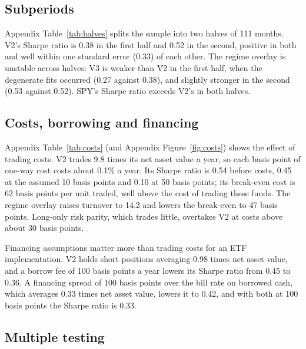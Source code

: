 \documentclass[11pt,a4paper]{article}
\begin{document}
\subsection{Subperiods}

Appendix Table~\ref{tab:halves} splits the sample into two halves of 111 months. V2's Sharpe ratio is 0.38 in the first half and 0.52 in the second, positive in both and well within one standard error (0.33) of each other. The regime overlay is unstable across halves: V3 is weaker than V2 in the first half, when the degenerate fits occurred (0.27 against 0.38), and slightly stronger in the second (0.53 against 0.52). SPY's Sharpe ratio exceeds V2's in both halves.

\subsection{Costs, borrowing and financing}
\label{sec:costs}

Appendix Table~\ref{tab:costs} (and Appendix Figure~\ref{fig:costs}) shows the effect of trading costs. V2 trades 9.8 times its net asset value a year, so each basis point of one-way cost costs about 0.1\% a year. Its Sharpe ratio is 0.54 before costs, 0.45 at the assumed 10 basis points and 0.10 at 50 basis points; its break-even cost is 62 basis points per unit traded, well above the cost of trading these funds. The regime overlay raises turnover to 14.2 and lowers the break-even to 47 basis points. Long-only risk parity, which trades little, overtakes V2 at costs above about 30 basis points.

Financing assumptions matter more than trading costs for an ETF implementation. V2 holds short positions averaging 0.98 times net asset value, and a borrow fee of 100 basis points a year lowers its Sharpe ratio from 0.45 to 0.36. A financing spread of 100 basis points over the bill rate on borrowed cash, which averages 0.33 times net asset value, lowers it to 0.42, and with both at 100 basis points the Sharpe ratio is 0.33.

\subsection{Multiple testing}
\label{sec:dsr}
\end{document}
